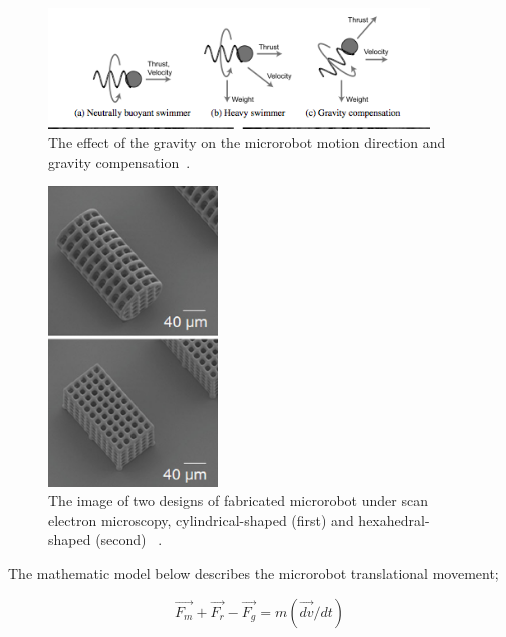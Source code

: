 \documentclass[a4paper,11pt]{article}
\begin{document}
\begin{sloppypar}
\begin{figure}
  \centering
    \includegraphics[width=0.9\textwidth]{11}
  \caption{The effect of the gravity on the microrobot motion direction and gravity compensation~\citep{mahoney2011velocity}.}
  \label{11}
\end{figure}


\begin{figure}
  \begin{center}
  \centering
    \includegraphics[width=0.4\textwidth]{4}
  \caption{The image of two designs of fabricated microrobot under scan electron microscopy, cylindrical-shaped (first)
and hexahedral-shaped (second) ~\citep{kim2013fabrication}.}
  \label{ref4}
\end{center}
\end{figure}

The mathematic model below describes the microrobot translational movement;

\begin{equation}
  \overrightarrow{F_m }+ \overrightarrow{F_r} - \overrightarrow{F_g} = m(\overrightarrow{dv}/dt)
\label{eq:4}
\end{equation}


\end{sloppypar}
\end{document}
